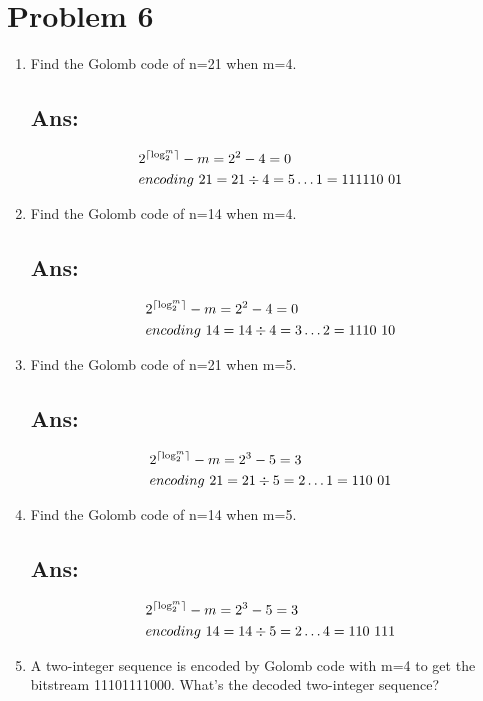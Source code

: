 \documentclass[a4paper, 11pt, oneside]{article} %
\DeclarePairedDelimiter\ceil{\lceil}{\rceil}
\begin{document}
\section*{Problem 6}
\begin{enumerate}[label=(\alph*)]
	\item Find the Golomb code of n=21 when m=4.
	\subsection*{Ans:}
	\begin{align*}
		&2^{\ceil*{\log_2^{m}}}-m=2^{2}-4 = 0 \\
      	&encoding~21 = 21 \div 4 = 5 \dots 1 = 111110~01 
	\end{align*}

	\item Find the Golomb code of n=14 when m=4.
	\subsection*{Ans:}
	\begin{align*}
		&2^{\ceil*{\log_2^{m}}}-m=2^{2}-4 = 0 \\
		&encoding~14 = 14 \div 4 = 3 \dots 2 = 1110~10 
	\end{align*}

	\item Find the Golomb code of n=21 when m=5.
	\subsection*{Ans:}
	\begin{align*}
		&2^{\ceil*{\log_2^{m}}}-m=2^{3}-5 = 3 \\
		&encoding~21 = 21 \div 5 = 2 \dots 1 = 110~01 
	\end{align*}

	\item Find the Golomb code of n=14 when m=5.
  	\subsection*{Ans:}
    \begin{align*}
		&2^{\ceil*{\log_2^{m}}}-m=2^{3}-5 = 3 \\
		&encoding~14 = 14 \div 5 = 2 \dots 4 = 110~111 
	\end{align*}
	
	\item A two-integer sequence is encoded by Golomb code with m=4 to get the bitstream
  	11101111000. What’s the decoded two-integer sequence?

\end{enumerate}
\end{document}
